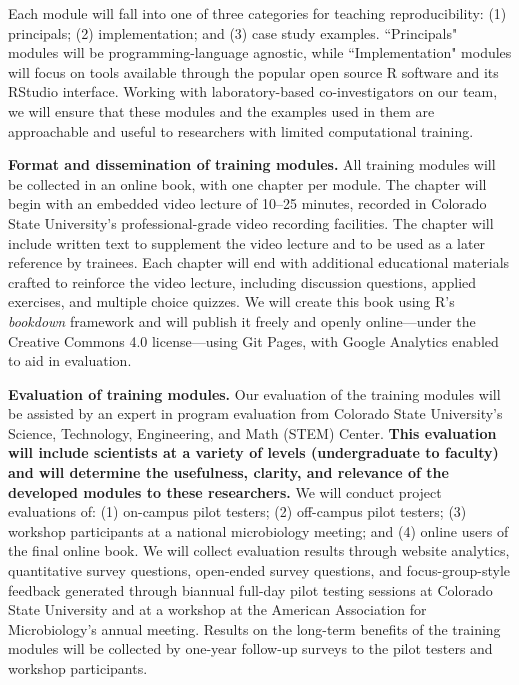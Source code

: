 \documentclass[pdftex,english,11pt,parskip=half]{scrartcl}
\begin{document}
Each module will fall into one of three categories for teaching reproducibility: (1) principals; (2) implementation; and (3) case study examples. ``Principals" modules will be programming-language agnostic, while ``Implementation" modules will focus on tools available through the popular open source R software and its RStudio interface. Working with laboratory-based co-investigators on our team, we will ensure that these modules and the examples used in them are approachable and useful to researchers with limited computational training.  

\textbf{Format and dissemination of training modules.} All training modules will be collected in an online book, with one chapter per module. The chapter will begin with an embedded video lecture of 10--25 minutes, recorded in Colorado State University's professional-grade video recording facilities. The chapter will include written text to supplement the video lecture and to be used as a later reference by trainees. Each chapter will end with additional educational materials crafted to reinforce the video lecture, including discussion questions, applied exercises, and multiple choice quizzes. We will create this book using R's \textit{bookdown} framework and will publish it freely and openly online---under the Creative Commons 4.0 license---using Git Pages, with Google Analytics enabled to aid in evaluation. 

\textbf{Evaluation of training modules.} Our evaluation of the training modules will be assisted by an expert in program evaluation from Colorado State University's Science, Technology, Engineering, and Math (STEM) Center. \textbf{This evaluation will include scientists at a variety of levels (undergraduate to faculty) and will determine the usefulness, clarity, and relevance of the developed modules to these researchers.} We will conduct project evaluations of: (1) on-campus pilot testers; (2) off-campus pilot testers; (3) workshop participants at a national microbiology meeting; and (4) online users of the final online book. We will collect evaluation results through website analytics, quantitative survey questions, open-ended survey questions, and focus-group-style feedback generated through biannual full-day pilot testing sessions at Colorado State University and at a workshop at the American Association for Microbiology's annual meeting. Results on the long-term benefits of the training modules will be collected by one-year follow-up surveys to the pilot testers and workshop participants.
\end{document}
